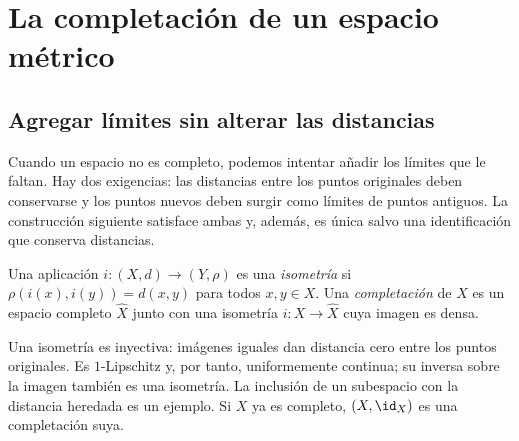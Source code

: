 \chapter{La completación de un espacio métrico}\label{chap:09}
\section{Agregar límites sin alterar las distancias}
Cuando un espacio no es completo, podemos intentar añadir los límites que le faltan. Hay dos exigencias: las distancias entre los puntos originales deben conservarse y los puntos nuevos deben surgir como límites de puntos antiguos. La construcción siguiente satisface ambas y, además, es única salvo una identificación que conserva distancias.

\begin{definicion}
Una aplicación $i:(X,d)\to(Y,\rho)$ es una \emph{isometría} si $\rho(i(x),i(y))=d(x,y)$ para todos $x,y\in X$. Una \emph{completación} de $X$ es un espacio completo $\widehat X$ junto con una isometría $i:X\to\widehat X$ cuya imagen es densa.
\end{definicion}
Una isometría es inyectiva: imágenes iguales dan distancia cero entre los puntos originales. Es $1$-Lipschitz y, por tanto, uniformemente continua; su inversa sobre la imagen también es una isometría. La inclusión de un subespacio con la distancia heredada es un ejemplo. Si $X$ ya es completo, $(X,\id_X)$ es una completación suya.

